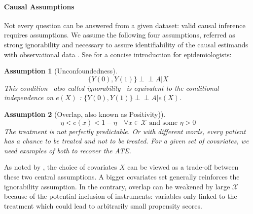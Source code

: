 \documentclass[french,12pt,twoside,a4paper]{book}
\newcommand{\indep}{\perp \!\!\! \perp}
\newtheorem{assumption}{Assumption}
\begin{document}
\begin{background_box_left}

  \paragraph{Causal Assumptions}\label{background:causal_assumptions}

  Not every question can be answered from a given dataset: valid causal
  inference requires assumptions. We assume the following four assumptions,
  referred as strong ignorability and necessary to assure identifiability of the
  causal estimands with observational data \citep{rubin_causal_2005}. See
  \cite{naimi2023defining} for a concise introduction for epidemiologists:

  \begin{assumption}[Unconfoundedness]\label{assumption:ignorability}
    \begin{equation*}\label{eq:ignorability}
      \{Y(0), Y(1) \} \indep A | X
    \end{equation*}
    This condition --also called ignorability-- is equivalent to the conditional
    independence on $e(X)$ \citep{rosenbaum_central_1983}: $\{Y(0), Y(1) \}
      \indep  A | e(X)$.
  \end{assumption}


  \begin{assumption}[Overlap, also known as Positivity)]\label{assumption:overlap}
    \begin{equation*}\label{eq:overlap}
      \eta < e(x) < 1 - \eta \quad \forall x \in \mathcal X \text{ and some } \eta > 0
    \end{equation*}
    The treatment is not perfectly predictable. Or with different words, every
    patient has a chance to be treated and not to be treated. For a given set of
    covariates, we need examples of both to recover the ATE.
  \end{assumption}

  As noted by \cite{damour_overlap_2020}, the choice of covariates $X$ can
  be viewed as a trade-off between these two central assumptions. A bigger
  covariates set generally reinforces the ignorability assumption. In the
  contrary, overlap can be weakened by large $\mathcal{X}$ because of the
  potential inclusion of instruments: variables only linked to the treatment which
  could lead to arbitrarily small propensity scores.



\end{background_box_left}
\end{document}

